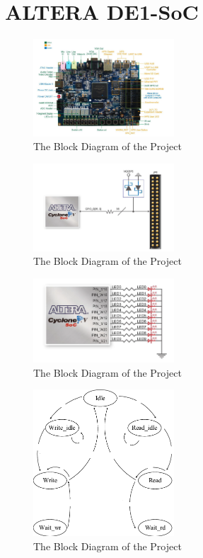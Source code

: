 \documentclass[paper]{IEEEtran}
\begin{document}
\section{ALTERA DE1-SoC}
\begin{figure}[h!]
	\setlength{\unitlength}{\textwidth}
	\center 
	\includegraphics[width=0.47\textwidth]{FPGA}
	\caption{\label{fig:FPGA}The Block Diagram of the Project}
\end{figure}

\begin{figure}[h!]
	\setlength{\unitlength}{\textwidth}
	\center 
	\includegraphics[width=0.47\textwidth]{GPIO_pins}
	\caption{\label{fig:GPIO_pins}The Block Diagram of the Project}
\end{figure}

\begin{figure}[h!]
	\setlength{\unitlength}{\textwidth}
	\center 
	\includegraphics[width=0.47\textwidth]{LEDs}
	\caption{\label{fig:LEDs}The Block Diagram of the Project}
\end{figure}

\begin{figure}[h!]
	\setlength{\unitlength}{\textwidth}
	\center 
	\includegraphics[width=0.47\textwidth]{RAM_state}
	\caption{\label{fig:RAM_state}The Block Diagram of the Project}
\end{figure}
\end{document}
